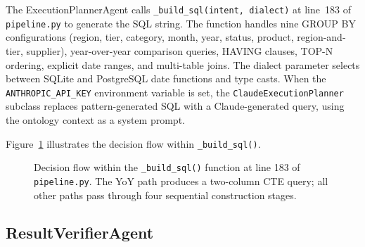 \documentclass[12pt,a4paper]{report}
\begin{document}
The ExecutionPlannerAgent calls \texttt{\_build\_sql(intent, dialect)} at line~183 of \texttt{pipeline.py} to generate the \ac{SQL} string. The function handles nine GROUP BY configurations (region, tier, category, month, year, status, product, region-and-tier, supplier), year-over-year comparison queries, HAVING clauses, TOP-N ordering, explicit date ranges, and multi-table joins. The dialect parameter selects between SQLite and PostgreSQL date functions and type casts. When the \texttt{ANTHROPIC\_API\_KEY} environment variable is set, the \texttt{ClaudeExecutionPlanner} subclass replaces pattern-generated \ac{SQL} with a Claude-generated query, using the ontology context as a system prompt.

Figure~\ref{fig:sql-builder} illustrates the decision flow within \texttt{\_build\_sql()}.

\begin{figure}[H]
  \centering
  \caption{Decision flow within the \texttt{\_build\_sql()} function at line 183 of \texttt{pipeline.py}. The YoY path produces a two-column CTE query; all other paths pass through four sequential construction stages.}
  \label{fig:sql-builder}
\end{figure}

\subsection{ResultVerifierAgent}
\label{subsec:result-verifier}
\end{document}
